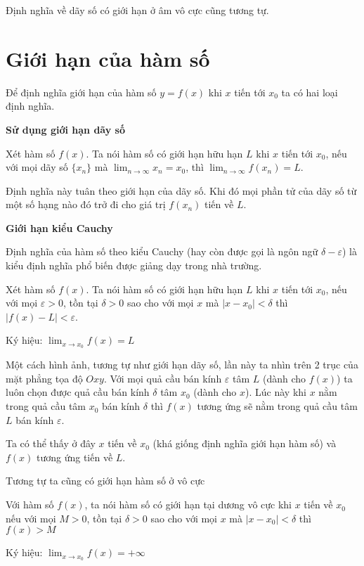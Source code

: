 Định nghĩa về dãy số có giới hạn ở âm vô cực cũng tương tự.

\section{Giới hạn của hàm số}

Để định nghĩa giới hạn của hàm số $y = f(x)$ khi $x$ tiến tới $x_0$
ta có hai loại định nghĩa.

\textbf{Sử dụng giới hạn dãy số}

\begin{definition}
    Xét hàm số $f(x)$. Ta nói hàm số có giới hạn hữu hạn $L$
    khi $x$ tiến tới $x_0$, nếu với mọi dãy số $\{x_n\}$ mà
    $\displaystyle{\lim_{n \to \infty} x_n = x_0}$, thì 
    $\displaystyle{\lim_{n \to \infty}
    f(x_n) = L}$.
\end{definition}

Định nghĩa này tuân theo giới hạn của dãy số. Khi đó mọi phần tử
của dãy số từ một số hạng nào đó trở đi cho giá trị $f(x_n)$ tiến
về $L$.

\textbf{Giới hạn kiểu Cauchy}

Định nghĩa của hàm số theo kiểu Cauchy (hay còn được gọi là
ngôn ngữ $\delta-\varepsilon$) là kiểu định nghĩa phổ biến được
giảng dạy trong nhà trường.

\begin{definition}
    Xét hàm số $f(x)$. Ta nói hàm số có giới hạn hữu hạn $L$
    khi $x$ tiến tới $x_0$, nếu với mọi $\varepsilon > 0$, tồn tại 
    $\delta > 0$ sao cho với mọi $x$ mà $| x - x_0 | < \delta$ thì
    $|f(x) - L| < \varepsilon$.

    Ký hiệu: $\displaystyle{\lim_{x \to x_0} f(x) = L}$
\end{definition}

Một cách hình ảnh, tương tự như giới hạn dãy số, lần này ta nhìn trên 2 trục 
của mặt phẳng tọa độ $Oxy$. Với mọi quả cầu bán kính $\varepsilon$ tâm $L$ (dành cho $f(x)$)
ta luôn chọn được quả cầu bán kính $\delta$ tâm $x_0$ (dành cho $x$). Lúc này khi $x$
nằm trong quả cầu tâm $x_0$ bán kính $\delta$ thì $f(x)$ tương ứng sẽ nằm trong quả cầu
tâm $L$ bán kính $\varepsilon$.

Ta có thể thấy ở đây $x$ tiến về $x_0$ (khá giống định nghĩa giới hạn hàm số)
và $f(x)$ tương ứng tiến về $L$.

Tương tự ta cũng có giới hạn hàm số ở vô cực

\begin{definition}
    Với hàm số $f(x)$, ta nói hàm số có giới hạn tại dương vô cực
    khi $x$ tiến về $x_0$ nếu với mọi $M > 0$, tồn tại $\delta > 0$ sao cho với mọi $x$ mà $|x - x_0| < \delta$ 
    thì $f(x) > M$

    Ký hiệu: $\displaystyle{\lim_{x \to x_0} f(x) = +\infty}$
\end{definition}

